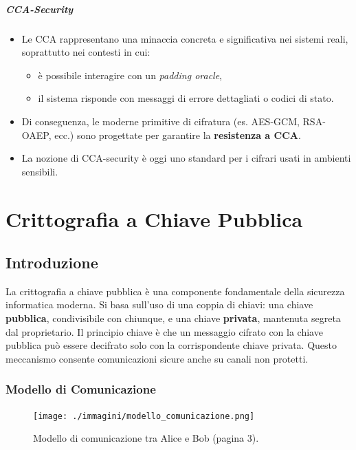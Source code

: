 \documentclass{report}
\begin{document}
\paragraph{CCA-Security}
\begin{itemize}
    \item Le CCA rappresentano una minaccia concreta e significativa nei sistemi reali, soprattutto nei contesti in cui:
    \begin{itemize}
        \item è possibile interagire con un \emph{padding oracle},
        \item il sistema risponde con messaggi di errore dettagliati o codici di stato.
    \end{itemize}
    \item Di conseguenza, le moderne primitive di cifratura (es. AES-GCM, RSA-OAEP, ecc.) sono progettate per garantire la \textbf{resistenza a CCA}.
    \item La nozione di CCA-security è oggi uno standard per i cifrari usati in ambienti sensibili.
\end{itemize}

\newpage

\chapter{Crittografia a Chiave Pubblica}
\section{Introduzione}

La crittografia a chiave pubblica \`e una componente fondamentale della sicurezza informatica moderna. Si basa sull'uso di una coppia di chiavi: una chiave \textbf{pubblica}, condivisibile con chiunque, e una chiave \textbf{privata}, mantenuta segreta dal proprietario. Il principio chiave \`e che un messaggio cifrato con la chiave pubblica pu\`o essere decifrato solo con la corrispondente chiave privata. Questo meccanismo consente comunicazioni sicure anche su canali non protetti.

\subsection{Modello di Comunicazione}

\begin{figure}[h]
    \centering
    \texttt{[image: ./immagini/modello\_comunicazione.png]}
    \caption{Modello di comunicazione tra Alice e Bob (pagina 3).}
    \label{fig:comm_model}
\end{figure}
\end{document}
